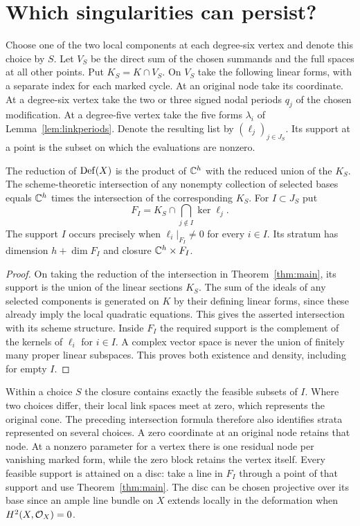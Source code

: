 \section{Which singularities can persist?}\label{sec:strata}

Choose one of the two local components at each degree-six vertex and
denote this choice by $S$. Let $V_S$ be the direct sum of the chosen
summands and the full spaces at all other points. Put $K_S=K\cap V_S$.
On $V_S$ take the following linear forms, with a separate index for
each marked cycle. At an original node take its coordinate. At a
degree-six vertex take the two or three signed nodal periods $q_j$ of
the chosen modification. At a degree-five vertex take the five forms
$\lambda_i$ of Lemma~\ref{lem:linkperiods}. Denote the resulting list
by $(\ell_j)_{j\in J_S}$. Its support at a point is the subset on
which the evaluations are nonzero.

\begin{corollary}\label{cor:strata}
The reduction of $\operatorname{Def}(X)$ is the product of $\mathbb C^h$ with the reduced
union of the $K_S$. The scheme-theoretic intersection of any nonempty collection
of selected bases equals $\mathbb C^h$ times the intersection of the corresponding
$K_S$. For $I\subset J_S$ put
\[
 F_I=K_S\cap\bigcap_{j\notin I}\ker\ell_j .
\]
The support $I$ occurs precisely when $\ell_i|_{F_I}\ne0$ for every
$i\in I$. Its stratum has dimension $h+\dim F_I$ and closure
$\mathbb C^h\times F_I$.
\end{corollary}
\begin{proof}
On taking the reduction of the intersection in Theorem~\ref{thm:main},
its support is the union of the linear sections $K_S$. The sum of the
ideals of any selected components is generated on $K$ by their defining
linear forms, since these already imply the local quadratic equations.
This gives the asserted intersection with its scheme structure.
Inside $F_I$ the required support is the complement of the kernels
of $\ell_i$ for $i\in I$. A complex vector space is never the union
of finitely many proper linear subspaces. This proves both existence and
density, including for empty $I$.
\end{proof}

Within a choice $S$ the closure contains exactly the feasible
subsets of $I$. Where two choices differ, their local link spaces meet
at zero, which represents the original cone. The preceding intersection
formula therefore also identifies strata represented on several choices.
A zero coordinate at an original node retains that node. At a nonzero
parameter for a vertex there is one residual node per vanishing marked
form, while the zero block retains the vertex itself.
Every feasible support is attained on a disc: take a line in $F_I$
through a point of that support and use Theorem~\ref{thm:main}.
The disc can be chosen projective over its base since an ample line
bundle on $X$ extends locally in the deformation when $H^2(X,\mathcal O_X)=0$.

